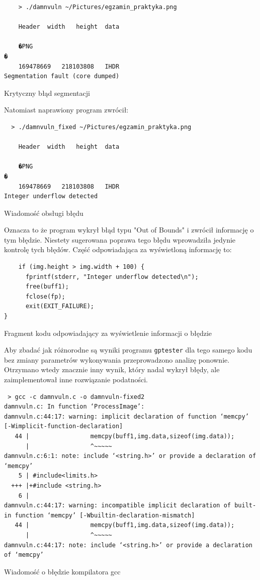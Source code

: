 \begin{listing}[H]
  \begin{verbatim}
    > ./damnvuln ~/Pictures/egzamin_praktyka.png 

	Header	width	height	data	

	�PNG
�
	169478669	218103808	IHDR
Segmentation fault (core dumped)
\end{verbatim}
\caption{Krytyczny błąd segmentacji}
\label{lst:seg_fault}
\end{listing}

Natomiast naprawiony program zwrócił:
\begin{listing}[H]
  \begin{verbatim}
  > ./damnvuln_fixed ~/Pictures/egzamin_praktyka.png 

	Header	width	height	data	

	�PNG
�
	169478669	218103808	IHDR
Integer underflow detected
\end{verbatim}
\caption{Wiadomość obsługi błędu}
\label{lst:code4}
\end{listing}

Oznacza to że program wykrył błąd typu "Out of Bounds" i zwrócił informację o tym błędzie. Niestety sugerowana poprawa tego błędu wprowadziła jedynie kontrolę tych błędów.
Część odpowiadająca za wyświetloną informację to:
\begin{listing}
  \begin{verbatim}
    if (img.height > img.width + 100) {
      fprintf(stderr, "Integer underflow detected\n");
      free(buff1);
      fclose(fp);
      exit(EXIT_FAILURE);
}
\end{verbatim}
\caption{Fragment kodu odpowiadający za wyświetlenie informacji o błędzie}
\label{lst:code3}
\end{listing}

Aby zbadać jak różnorodne są wyniki programu \texttt{gptester} dla tego samego kodu bez zmiany parametrów wykonywania przeprowadzono analizę ponownie. Otrzymano wtedy znacznie inny wynik, który nadal wykrył błędy, ale zaimplementował inne rozwiązanie podatności. 

\begin{listing}[H]
  \begin{verbatim}
 > gcc -c damnvuln.c -o damnvuln-fixed2
damnvuln.c: In function ‘ProcessImage’:
damnvuln.c:44:17: warning: implicit declaration of function ‘memcpy’ [-Wimplicit-function-declaration]
   44 |                 memcpy(buff1,img.data,sizeof(img.data));
      |                 ^~~~~~
damnvuln.c:6:1: note: include ‘<string.h>’ or provide a declaration of ‘memcpy’
    5 | #include<limits.h>
  +++ |+#include <string.h>
    6 | 
damnvuln.c:44:17: warning: incompatible implicit declaration of built-in function ‘memcpy’ [-Wbuiltin-declaration-mismatch]
   44 |                 memcpy(buff1,img.data,sizeof(img.data));
      |                 ^~~~~~
damnvuln.c:44:17: note: include ‘<string.h>’ or provide a declaration of ‘memcpy’

\end{verbatim}
\caption{Wiadomość o błędzie kompilatora gcc}
\label{lst:gcc_error}
\end{listing}


